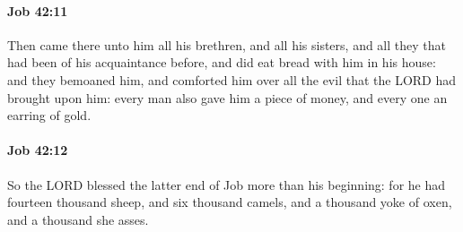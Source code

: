 		\paragraph{Job 42:11} %
			\label{JOB-42-11}

			Then came there unto him all his brethren, and all his sisters, and all they that had been of his acquaintance before, and did eat bread with him in his house: and they bemoaned him, and comforted him over all the evil that the LORD had brought upon him: every man also gave him a piece of money, and every one an earring of gold.


		\paragraph{Job 42:12} %
			\label{JOB-42-12}

			So the LORD blessed the latter end of Job more than his beginning: for he had fourteen thousand sheep, and six thousand camels, and a thousand yoke of oxen, and a thousand she asses.

